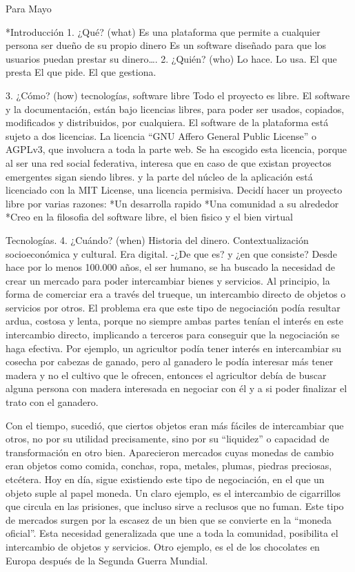 Para Mayo

*Introducción
1. ¿Qué? (what)
Es una plataforma que permite a cualquier persona ser dueño de su propio dinero
Es un software diseñado para que los usuarios puedan prestar su dinero….
2. ¿Quién? (who) 
Lo hace. 
Lo usa.
El que presta
El que pide.
El que gestiona.

3. ¿Cómo? (how)
tecnologías, software libre
Todo el proyecto es libre. El software y la documentación, están bajo licencias libres, para poder ser usados, copiados, modificados y distribuidos, por cualquiera. El software de la plataforma  está sujeto a dos licencias. La licencia ``GNU Affero General Public License'' o AGPLv3, que involucra a toda la parte web. Se ha escogido esta licencia, porque al ser una red social federativa, interesa que en caso de que existan proyectos emergentes sigan siendo libres.  y la parte del núcleo de la aplicación está licenciado con la MIT License, una licencia permisiva.
Decidí hacer un proyecto libre por varias razones:
*Un desarrolla rapido
*Una comunidad a su alrededor
*Creo en la filosofia del software libre, el bien fisico y el bien virtual

Tecnologías.
4. ¿Cuándo? (when) 
Historia del dinero.
Contextualización socioeconómica y cultural. Era digital.
-¿De que es? y ¿en que consiste?
Desde hace por lo menos 100.000 años, el ser humano, se ha buscado la necesidad de crear un mercado para poder intercambiar bienes y servicios. Al principio, la forma de comerciar era a través del trueque, un intercambio directo de objetos o servicios por otros. El problema era que este tipo de negociación podía resultar ardua, costosa y lenta, porque no siempre ambas partes tenían el interés en este intercambio directo, implicando a terceros para conseguir que la negociación se haga efectiva. Por ejemplo, un agricultor podía tener interés en intercambiar su cosecha por cabezas de ganado, pero al ganadero le podía interesar más tener madera y no el cultivo que le ofrecen, entonces el agricultor debía de buscar alguna persona con madera interesada en negociar con él y a si poder finalizar el trato con el ganadero. 

Con el tiempo, sucedió, que ciertos objetos eran más fáciles de intercambiar que otros, no por su utilidad precisamente, sino por su ``liquidez'' o capacidad de transformación en otro bien.  Aparecieron mercados cuyas monedas de cambio eran objetos como comida, conchas, ropa, metales, plumas, piedras preciosas, etcétera. Hoy en día, sigue existiendo este tipo de negociación, en el que un objeto suple al papel moneda. Un claro ejemplo, es el intercambio de cigarrillos que circula en las prisiones, que incluso sirve a reclusos que no fuman. Este tipo de mercados surgen por la escasez de un bien que se convierte en la ``moneda oficial''. Esta necesidad generalizada que une a toda la comunidad, posibilita el intercambio de objetos y servicios. Otro ejemplo, es el de los chocolates en Europa después de la Segunda Guerra Mundial.

